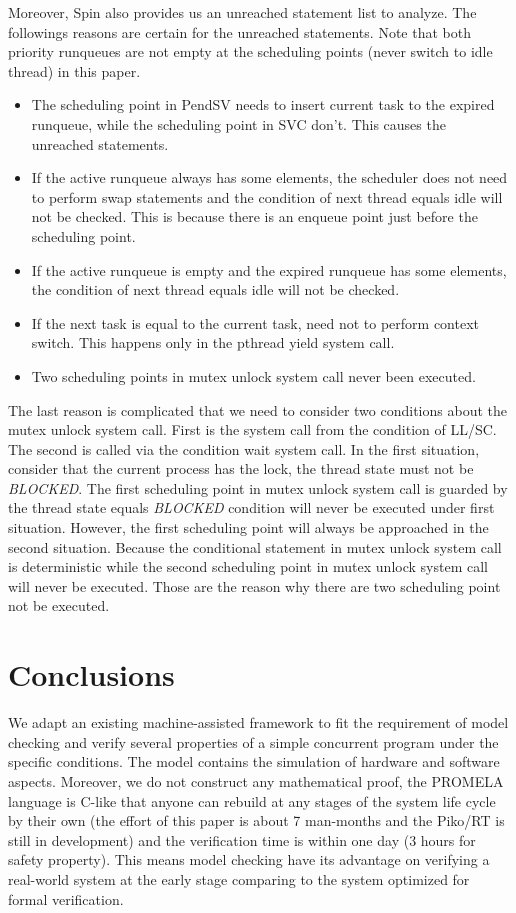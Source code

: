 Moreover, Spin also provides us an unreached statement list to analyze. The followings reasons are certain for the unreached statements. Note that both priority runqueues are not empty at the scheduling points (never switch to idle thread) in this paper.

\begin{itemize}
\item The scheduling point in PendSV needs to insert current task to the expired runqueue, while the scheduling point in SVC don't. This causes the unreached statements.
\item If the active runqueue always has some elements, the scheduler does not need to perform swap statements and the condition of next thread equals idle will not be checked. This is because there is an enqueue point just before the scheduling point.
\item If the active runqueue is empty and the expired runqueue has some elements, the condition of next thread equals idle will not be checked.
\item If the next task is equal to the current task, need not to perform context switch. This happens only in the pthread yield system call.
\item Two scheduling points in mutex unlock system call never been executed.
\end{itemize}

The last reason is complicated that we need to consider two conditions about the mutex unlock system call. First is the system call from the condition of LL/SC. The second is called via the condition wait system call. In the first situation, consider that the current process has the lock, the thread state must not be \textit{BLOCKED}. The first scheduling point in mutex unlock system call is guarded by the thread state equals \textit{BLOCKED} condition will never be executed under first situation. However, the first scheduling point will always be approached in the second situation. Because the conditional statement in mutex unlock system call is deterministic while the second scheduling point in mutex unlock system call will never be executed. Those are the reason why there are two scheduling point not be executed.

\section{Conclusions}
We adapt an existing machine-assisted framework to fit the requirement of model checking and verify several properties of a simple concurrent program under the specific conditions. The model contains the simulation of hardware and software aspects. Moreover, we do not construct any mathematical proof, the PROMELA language is C-like that anyone can rebuild at any stages of the system life cycle by their own (the effort of this paper is about 7 man-months and the Piko/RT is still in development) and the verification time is within one day (3 hours for safety property). This means model checking have its advantage on verifying a real-world system at the early stage comparing to the system optimized for formal verification.

